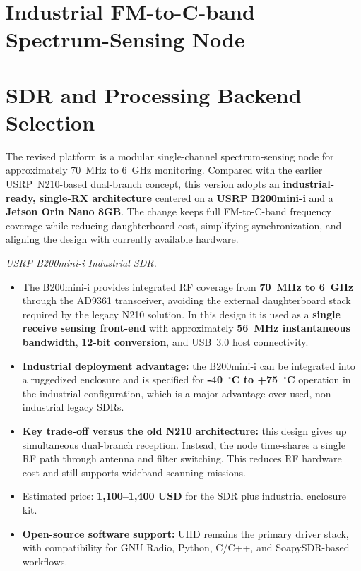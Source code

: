 \documentclass[11pt,a4paper]{article}
\newcommand{\blue}[1]{\textcolor{priceblue}{\textbf{#1}}}
\begin{document}
\section*{\centering Industrial FM-to-C-band Spectrum-Sensing Node}
\noindent
\section*{SDR and Processing Backend Selection}

The revised platform is a modular single-channel spectrum-sensing node for
approximately 70~MHz to 6~GHz monitoring. Compared with the earlier
USRP~N210-based dual-branch concept, this version adopts an
\textbf{industrial-ready, single-RX architecture} centered on a
\textbf{USRP B200mini-i} and a \textbf{Jetson Orin Nano 8GB}. The change keeps
full FM-to-C-band frequency coverage while reducing daughterboard cost,
simplifying synchronization, and aligning the design with currently available
hardware.

\medskip
\noindent
\textit{USRP B200mini-i Industrial SDR.}
\begin{itemize}
	\item The B200mini-i provides integrated RF coverage from
	\textbf{70~MHz to 6~GHz} through the AD9361 transceiver, avoiding the external
	daughterboard stack required by the legacy N210 solution. In this design it is
	used as a \textbf{single receive sensing front-end} with approximately
	\textbf{56~MHz instantaneous bandwidth}, \textbf{12-bit conversion}, and
	USB~3.0 host connectivity.
	\item \textbf{Industrial deployment advantage:} the B200mini-i can be integrated
	into a ruggedized enclosure and is specified for \textbf{-40~$^\circ$C to
	+75~$^\circ$C} operation in the industrial configuration, which is a major
	advantage over used, non-industrial legacy SDRs.
	\item \textbf{Key trade-off versus the old N210 architecture:} this design gives
	up simultaneous dual-branch reception. Instead, the node time-shares a
	single RF path through antenna and filter switching. This reduces RF hardware
	cost and still supports wideband scanning missions.
	\item Estimated price: \blue{1,100--1,400 USD} for the SDR plus industrial
	enclosure kit.
	\item \textbf{Open-source software support:} UHD remains the primary driver
	stack, with compatibility for GNU Radio, Python, C/C++, and SoapySDR-based
	workflows.
\end{itemize}
\end{document}
